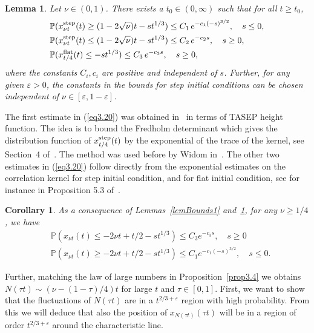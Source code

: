 \documentclass[12pt,a4paper]{article}
\numberwithin{equation}{section}
\newcommand{\Pb}{\mathbb{P}}
\newcommand{\e}{\varepsilon}
\newtheorem{lem}[prop]{Lemma}
\newtheorem{cor}[prop]{Corollary}
\begin{document}
\begin{lem}\label{lemBound2}
Let $\nu \in (0,1)$. There exists a $t_0\in (0,\infty)$ such that for all $t\geq t_0$,
\begin{equation}\label{eq3.20}
\begin{aligned}
&\Pb(x^{\rm step}_{\nu t}(t)\geq (1-2\sqrt{\nu})t-s t^{1/3})\leq C_1\, e^{-c_1 (-s)^{3/2}},\quad s\leq 0,\\
&\Pb(x^{\rm step}_{\nu t}(t)\leq (1-2\sqrt{\nu})t -s t^{1/3})\leq C_2 \,e^{-c_2 s},\quad s\geq 0,\\
&\Pb(x^{\rm flat}_{t/4}(t)\leq -s t^{1/3})\leq C_3 \,e^{-c_3 s},\quad s\geq 0,
\end{aligned}
\end{equation}
where the constants $C_i,c_i$ are positive and independent of $s$. Further, for any given $\e>0$, the constants in the bounds for step initial conditions can be chosen independent of $\nu\in [\e,1-\e]$.
\end{lem}
The first estimate in (\ref{eq3.20}) was obtained in~\cite{BFP12} in terms of TASEP height function. The idea is to bound the Fredholm determinant which gives the distribution function of $x^{\rm step}_{t/4}(t)$ by the exponential of the trace of the kernel, see Section~4 of~\cite{BFP12}. The method was used before by Widom in~\cite{Wid02}. The other two estimates in (\ref{eq3.20}) follow directly from the exponential estimates on the correlation kernel for step initial condition, and for flat initial condition, see for instance in Proposition 5.3 of~\cite{BF07}.

\begin{cor}\label{corBounds}
As a consequence of Lemmas~\ref{lemBounds1} and~\ref{lemBound2}, for any $\nu\geq 1/4$, we have
\begin{equation}\label{eqBounds}
\begin{aligned}
&\Pb(x_{\nu t}(t)\leq -2\nu t+t/2-s t^{1/3})\leq C_3 e^{-c_3 s},\quad s\geq 0\\
&\Pb(x_{\nu t}(t)\geq -2\nu t+t/2-s t^{1/3})\leq C_1 e^{-c_1 (-s)^{3/2}},\quad s\leq 0.
\end{aligned}
\end{equation}
\end{cor}

Further, matching the law of large numbers in Proposition~\ref{prop3.4} we obtains $N(\tau t)\sim (\nu-(1-\tau)/4)t$ for large $t$ and $\tau \in [0,1]$. First, we want to show that the fluctuations of $N(\tau t)$ are in a $t^{2/3+\e}$ region with high probability. From this we will deduce that also the position of $x_{N(\tau t)}(\tau t)$ will be in a region of order $t^{2/3+\e}$ around the characteristic line.
\end{document}
